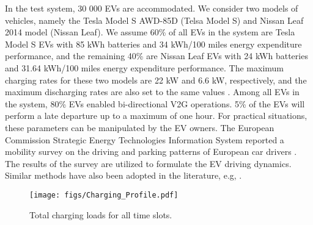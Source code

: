 \documentclass[conference]{IEEEtran}
\begin{document}
	In the test system, 30 000 EVs are accommodated. We consider two models of vehicles, namely the Tesla Model S AWD-85D (Telsa Model S) and Nissan Leaf 2014 model (Nissan Leaf). We assume 60\% of all EVs in the system are Tesla Model S EVs with 85 kWh batteries and 34 kWh/100 miles energy expenditure performance, and the remaining 40\% are Nissan Leaf EVs with 24 kWh batteries and 31.64 kWh/100 miles energy expenditure performance. The maximum charging rates for these two models are 22 kW and 6.6 kW, respectively, and the maximum discharging rates are also set to the same values \cite{Nguyen2014}. Among all EVs in the system, 80\% EVs enabled bi-directional V2G operations. 5\% of the EVs will perform a late departure up to a maximum of one hour. For practical situations, these parameters can be manipulated by the EV owners. The European Commission Strategic Energy Technologies Information System reported a mobility survey on the driving and parking patterns of European car drivers \cite{Pasaoglu2012}. The results of the survey are utilized to formulate the EV driving dynamics. Similar methods have also been adopted in the literature, e.g, \cite{Yao2013}.
	




	\begin{figure*}
		\centering
		\texttt{[image: figs/Charging\_Profile.pdf]}
        \vspace*{-2mm}
		\caption{Total charging loads for all time slots.}
        \vspace*{-4mm}
		\label{fig:charging}
	\end{figure*}
	
\end{document}
